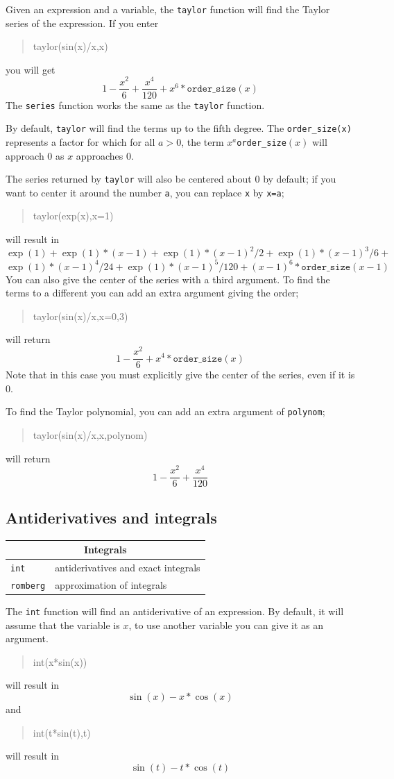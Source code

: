 \documentclass{article}
\newcommand{\xcasin}[1]
{\begin{quote}\ttfamily
#1
\end{quote}}
\newcommand{\xcasout}[1]
{\begin{equation*}
#1
\end{equation*}}
\begin{document}
Given an expression and a variable, the \texttt{taylor} function will
find the Taylor series of the expression.  If you enter
\xcasin{taylor(sin(x)/x,x)}
you will get
\xcasout{1-\frac{x^2}{6} + \frac{x^4}{120} + x^6*\texttt{order\_size}(x)}
The \texttt{series} function works the same as the \texttt{taylor}
function.

By default, \texttt{taylor} will find the terms up to the fifth
degree.  The \texttt{order\_size(x)} represents a factor for which 
for all $a>0$, the term $x^a$\texttt{order\_size}$(x)$ will approach 0
as $x$  approaches 0.  

The series returned by \texttt{taylor} will also
be centered about 0 by default; if you want to center it around the number
\texttt{a}, you can replace \texttt{x} by \texttt{x=a};
\xcasin{taylor(exp(x),x=1)}
will result in
\xcasout{\exp(1)+\exp(1)*(x-1)+\exp(1)*(x-1)^2/2+ \exp(1)*(x-1)^3/6+}
\xcasout{\exp(1)*(x-1)^4/24+\exp(1)*(x-1)^5/120+(x-1)^6*\texttt{order\_size}(x-1)}
You can also give the center of the series with a third argument.
To find the terms to a different you can add an extra argument
giving the order;
\xcasin{taylor(sin(x)/x,x=0,3)}
will return
\xcasout{1-\frac{x^2}{6} + x^4*\texttt{order\_size}(x)}
Note that in this case you must explicitly give the center of the
series, even if it is 0.

To find the Taylor polynomial, you can add an extra argument of
\texttt{polynom};
\xcasin{taylor(sin(x)/x,x,polynom)}
will return
\xcasout{1-\frac{x^2}{6} + \frac{x^4}{120}}


\subsection{Antiderivatives and integrals}

\begin{center}
\begin{tabular}{|p{}|p{}|}
\hline
\multicolumn{2}{|c|}{\textbf{Integrals}}\\
\hline\hline
\texttt{int} & antiderivatives and exact integrals\\
\texttt{romberg} & approximation of integrals\\
\hline
\end{tabular}
\end{center}

The \texttt{int} function will find an antiderivative of an
expression.  By default, it will assume that the variable is $x$, to
use another variable you can give it as an argument.
\xcasin{int(x*sin(x))}
will result in
\xcasout{\sin(x) - x*\cos(x)}
and
\xcasin{int(t*sin(t),t)}
will result in
\xcasout{\sin(t) - t*\cos(t)}
\end{document}
